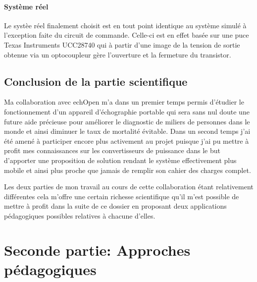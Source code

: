 \documentclass[12pt]{article}
\begin{document}
\vspace{20pt}

\paragraph{Système réel}
 
Le systèe réel finalement choisit est en tout point identique au système simulé à l'exception faite du circuit de commande. Celle-ci est en effet basée sur une puce Texas Instruments UCC28740 qui à partir d'une image de la tension de sortie obtenue via un optocoupleur gère l'ouverture et la fermeture du transistor.\par


\vspace{5pt}

\subsection{Conclusion de la partie scientifique} 
 
Ma collaboration avec echOpen m'a dans un premier temps permis d'étudier le fonctionnement d'un appareil d'échographie portable qui sera sans nul doute une future aide précieuse pour améliorer le diagnostic de miliers de personnes dans le monde et ainsi diminuer le taux de mortalité évitable. Dans un second temps j'ai été amené à participer encore plus activement au projet puisque j'ai pu mettre à profit mes connaissances sur les convertisseurs de puissance dans le but d'apporter une proposition de solution rendant le système effectivement plus mobile et ainsi plus proche que jamais de remplir son cahier des charges complet. \par 
\vspace{8pt}
Les deux parties de mon travail au cours de cette collaboration étant relativement différentes cela m'offre une certain richesse scientifique qu'il m'est possible de mettre à profit dans la suite de ce dossier en proposant deux applications pédagogiques possibles relatives à chacune d'elles.
 
 
 
 
 
 
 
  
\newpage

\newpage





\newpage
\section{Seconde partie: Approches pédagogiques}
\end{document}
